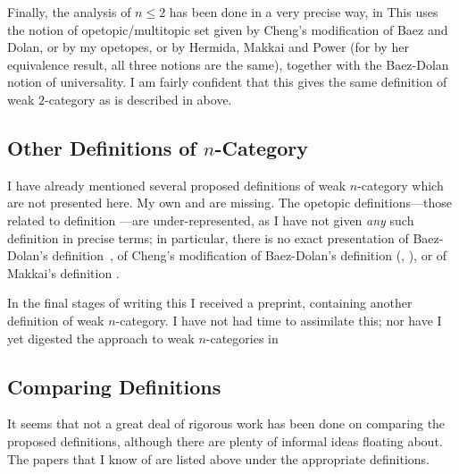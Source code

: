 Finally, the analysis of $n\leq 2$ has been done in a very precise way, in
% 
%
% 
This uses the notion of opetopic/multitopic set given by Cheng's modification
of Baez and Dolan, or by my opetopes, or by Hermida, Makkai and Power (for by
her equivalence result, all three notions are the same), together with the
Baez-Dolan notion of universality.  I am fairly confident that this gives the
same definition of weak $2$-category as is described in  above.



\subsection*{Other Definitions of $n$-Category}


I have already mentioned several proposed definitions of weak $n$-category
which are not presented here.  My own  and  are
missing.  The opetopic definitions---those related to definition ---are
under-represented, as I have not given \emph{any} such definition in precise
terms; in particular, there is no exact presentation of Baez-Dolan's
definition~, of Cheng's modification of Baez-Dolan's definition
(, ), or of Makkai's definition .

In the final stages of writing this I received a preprint,
% 
%
% 
containing another definition of weak $n$-category.  I have not had time to
assimilate this; nor have I yet digested the approach to weak $n$-categories
in
% 
%
% 
% 
%
% 


\subsection*{Comparing Definitions}

It seems that not a great deal of rigorous work has been done on comparing the
proposed definitions, although there are plenty of informal ideas floating
about.  The papers that I know of are listed above under the appropriate
definitions.  

